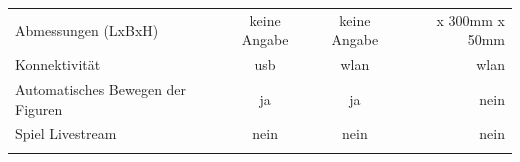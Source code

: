 \begin{longtable}[]{@{}lccr@{}}
\begin{minipage}[t]{0.19\columnwidth}
Abmessungen (LxBxH)\strut
\end{minipage} & \begin{minipage}[t]{0.25\columnwidth}\centering
keine Angabe\strut
\end{minipage} & \begin{minipage}[t]{0.26\columnwidth}\centering
keine Angabe\strut
\end{minipage} & \begin{minipage}[t]{0.19\columnwidth}\raggedleft
450mm x 300mm x 50mm\strut
\end{minipage}\tabularnewline
\begin{minipage}[t]{0.19\columnwidth}\raggedright
Konnektivität\strut
\end{minipage} & \begin{minipage}[t]{0.25\columnwidth}\centering
\gls{usb}\strut
\end{minipage} & \begin{minipage}[t]{0.26\columnwidth}\centering
\gls{wlan}\strut
\end{minipage} & \begin{minipage}[t]{0.19\columnwidth}\raggedleft
\gls{wlan}\strut
\end{minipage}\tabularnewline
\begin{minipage}[t]{0.19\columnwidth}\raggedright
Automatisches Bewegen der Figuren\strut
\end{minipage} & \begin{minipage}[t]{0.25\columnwidth}\centering
ja\strut
\end{minipage} & \begin{minipage}[t]{0.26\columnwidth}\centering
ja\strut
\end{minipage} & \begin{minipage}[t]{0.19\columnwidth}\raggedleft
nein\strut
\end{minipage}\tabularnewline
\begin{minipage}[t]{0.19\columnwidth}\raggedright
Spiel Livestream\strut
\end{minipage} & \begin{minipage}[t]{0.25\columnwidth}\centering
nein\strut
\end{minipage} & \begin{minipage}[t]{0.26\columnwidth}\centering
nein\strut
\end{minipage} & \begin{minipage}[t]{0.19\columnwidth}\raggedleft
nein\strut
\end{minipage}\tabularnewline
\begin{minipage}[t]{0.19\columnwidth}\raggedright

\end{minipage}
\end{longtable}
